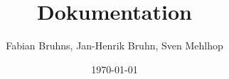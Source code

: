 \documentclass[a4paper,titlepage]{scrartcl}
\begin{document}
	
	\title{Dokumentation}
	\author{Fabian Bruhns, Jan-Henrik Bruhn, Sven Mehlhop} 
	\date{\today} 
	\maketitle
	\tableofcontents
	
	
	
	
	
	
	
\end{document}
